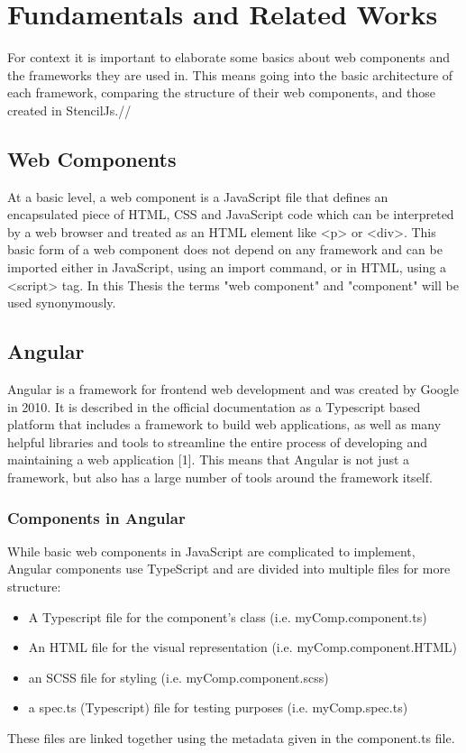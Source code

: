 \chapter{Fundamentals and Related Works}
\label{cha:fundamentals}
For context it is important to elaborate some basics about web components and the frameworks they are used in. This means going into the basic architecture of each framework, comparing the structure of their web components, and those created in StencilJs.//

\section{Web Components}
At a basic level, a web component is a JavaScript file that defines an encapsulated piece of HTML, CSS and JavaScript code which can be interpreted by a web browser and treated as an HTML element like <p> or <div>. This basic form of a web component does not depend on any framework and can be imported either in JavaScript, using an import command, or in HTML, using a <script> tag. In this Thesis the terms "web component" and "component" will be used synonymously.

\section{Angular}
Angular is a framework for frontend web development and was created by Google in 2010. It is described in the official documentation as a Typescript based platform that includes a framework to build web applications, as well as many helpful libraries and tools to streamline the entire process of developing and maintaining a web application [1]. This means that Angular is not just a framework, but also has a large number of tools around the framework itself.

\subsection{Components in Angular}
While basic web components in JavaScript are complicated to implement, Angular components use TypeScript and are divided into multiple files for more structure:

\begin{itemize}
\item A Typescript file for the component’s class (i.e. myComp.component.ts)
\item An HTML file for the visual representation (i.e. myComp.component.HTML)
\item an SCSS file for styling (i.e. myComp.component.scss)
\item a spec.ts (Typescript) file for testing purposes (i.e. myComp.spec.ts)
\end{itemize}
These files are linked together using the metadata given in the component.ts file.

